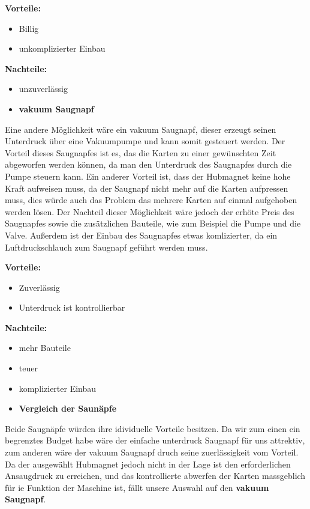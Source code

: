 \textbf{Vorteile:}
\begin{itemize}
    \item Billig
    \item unkomplizierter Einbau
\end{itemize}
\textbf{Nachteile:}
\begin{itemize}
    \item unzuverlässig
\end{itemize}

\begin{itemize}
    \item \textbf{vakuum Saugnapf}
\end{itemize}
Eine andere Möglichkeit wäre ein vakuum Saugnapf, dieser erzeugt seinen Unterdruck über eine Vakuumpumpe und kann somit gesteuert werden. Der Vorteil dieses Saugnapfes ist es, das die Karten zu einer gewünschten Zeit abgeworfen werden können, da man den
Unterdruck des Saugnapfes durch die Pumpe steuern kann. Ein anderer Vorteil ist, dass der Hubmagnet keine hohe Kraft aufweisen muss, da der Saugnapf nicht mehr auf die Karten aufpressen muss, dies würde auch das Problem das mehrere Karten auf einmal
aufgehoben werden lösen. Der Nachteil dieser Möglichkeit wäre jedoch der erhöte Preis des Saugnapfes sowie die zusätzlichen Bauteile, wie zum Beispiel die Pumpe und die Valve. Außerdem ist der Einbau des Saugnapfes etwas komlizierter, da ein Luftdruckschlauch
zum Saugnapf geführt werden muss.

\textbf{Vorteile:}
\begin{itemize}
    \item Zuverlässig
    \item Unterdruck ist kontrollierbar
\end{itemize}
\textbf{Nachteile:}
\begin{itemize}
    \item mehr Bauteile
    \item teuer
    \item komplizierter Einbau
\end{itemize}

\begin{itemize}
    \item \textbf{Vergleich der Saunäpfe}
\end{itemize}

Beide Saugnäpfe würden ihre idividuelle Vorteile besitzen. Da wir zum einen ein begrenztes Budget habe wäre der einfache unterdruck Saugnapf für uns attrektiv, zum anderen wäre der vakuum Saugnapf druch seine zuerlässigkeit vom Vorteil.
Da der ausgewählt Hubmagnet jedoch nicht in der Lage ist den erforderlichen Ansaugdruck zu erreichen, und das kontrollierte abwerfen der Karten massgeblich für ie Funktion der Maschine ist, fällt unsere Auswahl auf den \textbf{vakuum Saugnapf}.
